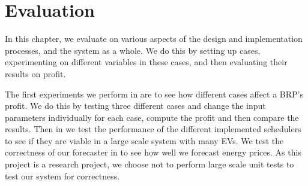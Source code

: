\chapter{Evaluation}\label{chap:evaluation}
In this chapter, we evaluate on various aspects of the design and implementation processes, and the system as a whole. We do this by setting up cases, experimenting on different variables in these cases, and then evaluating their results on profit.

The first experiments we perform in  are to see how different cases affect a BRP's profit. We do this by testing three different cases and change the input parameters individually for each case, compute the profit and then compare the results. Then in  we test the performance of the different implemented schedulers to see if they are viable in a large scale system with many EVs. We test the correctness of our forecaster in  to see how well we forecast energy prices. As this project is a research project, we choose not to perform large scale unit tests to test our system for correctness. 

\lipsum